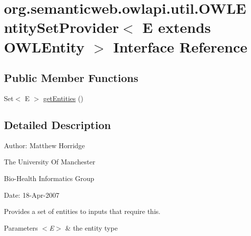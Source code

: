 \hypertarget{interfaceorg_1_1semanticweb_1_1owlapi_1_1util_1_1_o_w_l_entity_set_provider_3_01_e_01extends_01_o_w_l_entity_01_4}{\section{org.\-semanticweb.\-owlapi.\-util.\-O\-W\-L\-Entity\-Set\-Provider$<$ E extends O\-W\-L\-Entity $>$ Interface Reference}
\label{interfaceorg_1_1semanticweb_1_1owlapi_1_1util_1_1_o_w_l_entity_set_provider_3_01_e_01extends_01_o_w_l_entity_01_4}
}
\subsection*{Public Member Functions}
\begin{DoxyCompactItemize}
\item 
Set$<$ E $>$ \hyperlink{interfaceorg_1_1semanticweb_1_1owlapi_1_1util_1_1_o_w_l_entity_set_provider_3_01_e_01extends_01_o_w_l_entity_01_4_ace3253f0f9e257cb95ebd24e9ec5000c}{get\-Entities} ()
\end{DoxyCompactItemize}


\subsection{Detailed Description}
Author\-: Matthew Horridge\par
 The University Of Manchester\par
 Bio-\/\-Health Informatics Group\par
 Date\-: 18-\/\-Apr-\/2007\par
\par
 

Provides a set of entities to inputs that require this. 
\begin{DoxyParams}{Parameters}
{\em $<$\-E$>$} & the entity type \\
\hline
\end{DoxyParams}


